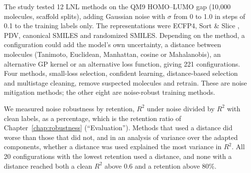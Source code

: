 The study tested 12 LNL methods on the QM9 HOMO--LUMO gap (10,000 molecules, scaffold splits), adding Gaussian noise with $\sigma$ from 0 to 1.0 in steps of 0.1 to the training labels only. The representations were ECFP4, Sort \& Slice \citep{sns}, PDV, canonical SMILES and randomized SMILES. Depending on the method, a configuration could add the model's own uncertainty, a distance between molecules (Tanimoto, Euclidean, Manhattan, cosine or Mahalanobis), an alternative GP kernel or an alternative loss function, giving 221 configurations. Four methods, small-loss selection, confident learning, distance-based selection and multistage cleaning, remove suspected molecules and retrain. These are noise mitigation methods; the other eight are noise-robust training methods.

We measured noise robustness by retention, $R^2$ under noise divided by $R^2$ with clean labels, as a percentage, which is the retention ratio of Chapter~\ref{chap:robustness} (``Evaluation''). Methods that used a distance did worse than those that did not, and in an analysis of variance over the adapted components, whether a distance was used explained the most variance in $R^2$. All 20 configurations with the lowest retention used a distance, and none with a distance reached both a clean $R^2$ above 0.6 and a retention above 80\%.

